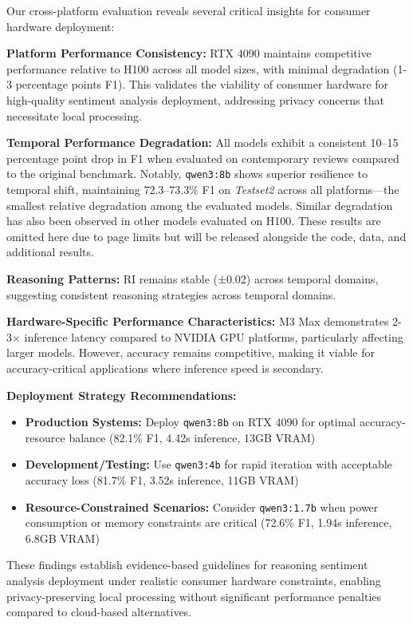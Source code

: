 \documentclass[conference]{IEEEtran}
\begin{document}
Our cross-platform evaluation reveals several critical insights for consumer hardware deployment:

\textbf{Platform Performance Consistency:} RTX 4090 maintains competitive performance relative to H100 across all model sizes, with minimal degradation (1-3 percentage points F1). This validates the viability of consumer hardware for high-quality sentiment analysis deployment, addressing privacy concerns that necessitate local processing.

\textbf{Temporal Performance Degradation:} All models exhibit a consistent 10--15 percentage point drop in F1 when evaluated on contemporary reviews compared to the original benchmark. Notably, \texttt{qwen3:8b} shows superior resilience to temporal shift, maintaining 72.3--73.3\% F1 on \textit{Testset2} across all platforms—the smallest relative degradation among the evaluated models. Similar degradation has also been observed in other models evaluated on H100. These results are omitted here due to page limits but will be released alongside the code, data, and additional results.

\textbf{Reasoning Patterns:} RI remains stable (±0.02) across temporal domains, suggesting consistent reasoning strategies across temporal domains.

\textbf{Hardware-Specific Performance Characteristics:} M3 Max demonstrates 2-3× inference latency compared to NVIDIA GPU platforms, particularly affecting larger models. However, accuracy remains competitive, making it viable for accuracy-critical applications where inference speed is secondary.

\textbf{Deployment Strategy Recommendations:}
\begin{itemize}[leftmargin=*,nosep]
\item \textbf{Production Systems:} Deploy \texttt{qwen3:8b} on RTX 4090 for optimal accuracy-resource balance (82.1\% F1, 4.42s inference, 13GB VRAM)
\item \textbf{Development/Testing:} Use \texttt{qwen3:4b} for rapid iteration with acceptable accuracy loss (81.7\% F1, 3.52s inference, 11GB VRAM)
\item \textbf{Resource-Constrained Scenarios:} Consider \texttt{qwen3:1.7b} when power consumption or memory constraints are critical (72.6\% F1, 1.94s inference, 6.8GB VRAM)
\end{itemize}

These findings establish evidence-based guidelines for reasoning sentiment analysis deployment under realistic consumer hardware constraints, enabling privacy-preserving local processing without significant performance penalties compared to cloud-based alternatives.
\end{document}
